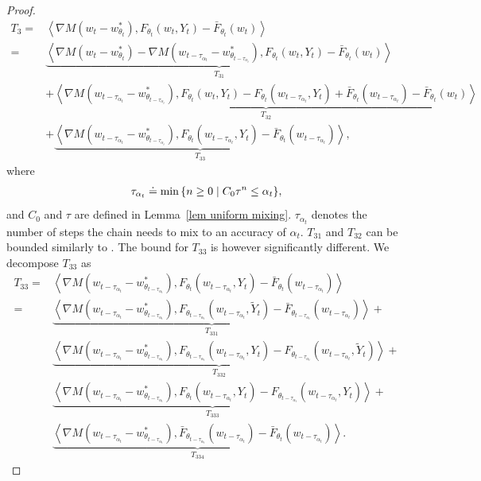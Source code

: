 \documentclass[twoside,11pt]{article}
\newcommand{\indot}[2]{{\left<#1, #2\right>}}
\numberwithin{assucounter}{section}
\begin{document}
\begin{proof}
\begin{align}
    T_3 =& \indot{\nabla M(w_t - w^*_{\theta_t})}{F_{\theta_t}(w_t, Y_t) - \bar F_{\theta_t}(w_t)} \\
    =&\underbrace{\indot{\nabla M(w_t - w^*_{\theta_t}) - \nabla M(w_{t-\tau_{\alpha_t}} - w^*_{\theta_{t-\tau_{\alpha_t}}})}{F_{\theta_t}(w_t, Y_t) - \bar F_{\theta_t}(w_t)}}_{T_{31}} \\
    &+\underbrace{\indot{\nabla M(w_{t-\tau_{\alpha_t}} - w^*_{\theta_{t-\tau_{\alpha_t}}})}{F_{\theta_t}(w_t, Y_t) - F_{\theta_t}(w_{t- \tau_{\alpha_t}}, Y_t) + \bar F_{\theta_t}(w_{t- \tau_{\alpha_t}}) - \bar F_{\theta_t}(w_t)}}_{T_{32}}\\
    &+\underbrace{\indot{\nabla M(w_{t-\tau_{\alpha_t}} - w^*_{\theta_{t-\tau_{\alpha_t}}})}{F_{\theta_t}(w_{t- \tau_{\alpha_t}}, Y_t) - \bar F_{\theta_t}(w_{t- \tau_{\alpha_t}})}}_{T_{33}},
\end{align}
where
\begin{align}
  \label{eq definition of tau alpha t}
    \tau_{\alpha_t} \doteq \min\qty{n \geq 0 \mid C_0 \tau^n \leq \alpha_t},
\end{align}
and $C_0$ and $\tau$ are defined in Lemma~\ref{lem uniform mixing}.
$\tau_{\alpha_t}$ denotes the number of steps the chain needs to mix to an accuracy of $\alpha_t$.
$T_{31}$ and $T_{32}$ can be bounded similarly to \citet{chen2021lyapunov}.
The bound for $T_{33}$ is however significantly different.
We decompose $T_{33}$ as
\begin{align}
  T_{33} =& \indot{\nabla M(w_{t-\tau_{\alpha_t}} - w^*_{\theta_{t-\tau_{\alpha_t}}})}{F_{\theta_t}(w_{t- \tau_{\alpha_t}}, Y_t) - \bar F_{\theta_t}(w_{t- \tau_{\alpha_t}})} \\
  =& \underbrace{\indot{\nabla M(w_{t-\tau_{\alpha_t}} - w^*_{\theta_{t-\tau_{\alpha_t}}})}{F_{\theta_{t - \tau_{\alpha_t}}}(w_{t- \tau_{\alpha_t}}, \tilde Y_t) - \bar F_{\theta_{t-\tau_{\alpha_t}}}(w_{t- \tau_{\alpha_t}})}}_{T_{331}} + \\
  & \underbrace{\indot{\nabla M(w_{t-\tau_{\alpha_t}} - w^*_{\theta_{t-\tau_{\alpha_t}}})}{F_{\theta_{t - \tau_{\alpha_t}}}(w_{t- \tau_{\alpha_t}}, Y_t) -F_{\theta_{t - \tau_{\alpha_t}}}(w_{t- \tau_{\alpha_t}}, \tilde Y_t)}}_{T_{332}} + \\
  & \underbrace{\indot{\nabla M(w_{t-\tau_{\alpha_t}} - w^*_{\theta_{t-\tau_{\alpha_t}}})}{F_{\theta_{t}}(w_{t- \tau_{\alpha_t}}, Y_t) -F_{\theta_{t - \tau_{\alpha_t}}}(w_{t- \tau_{\alpha_t}}, Y_t)}}_{T_{333}} + \\
  & \underbrace{\indot{\nabla M(w_{t-\tau_{\alpha_t}} - w^*_{\theta_{t-\tau_{\alpha_t}}})}{\bar F_{\theta_{t-\tau_{\alpha_t}}}(w_{t- \tau_{\alpha_t}}) - \bar F_{\theta_{t}}(w_{t- \tau_{\alpha_t}})}}_{T_{334}}.

\end{align}
\end{proof}
\end{document}
